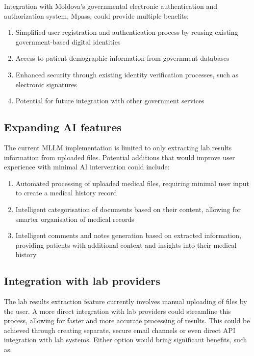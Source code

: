 Integration with Moldova's governmental electronic authentication and authorization system, Mpass, could provide multiple benefits:

\begin{enumerate}
    \item Simplified user registration and authentication process by reusing existing government-based digital identities
    \item Access to patient demographic information from government databases
    \item Enhanced security through existing identity verification processes, such as electronic signatures
    \item Potential for future integration with other government services
\end{enumerate}

\subsection{Expanding AI features}

The current MLLM implementation is limited to only extracting lab results information from uploaded files. Potential additions that would improve user experience with minimal AI intervention could include:

\begin{enumerate}
    \item Automated processing of uploaded medical files, requiring minimal user input to create a medical history record
    \item Intelligent categorisation of documents based on their content, allowing for smarter organisation of medical records
    \item Intelligent comments and notes generation based on extracted information, providing patients with additional context and insights into their medical history 
\end{enumerate}

\subsection{Integration with lab providers}

The lab results extraction feature currently involves manual uploading of files by the user. A more direct integration with lab providers could streamline this process, allowing for faster and more accurate processing of results. This could be achieved through creating separate, secure email channels or even direct API integration with lab systems. Either option would bring significant benefits, such as:

